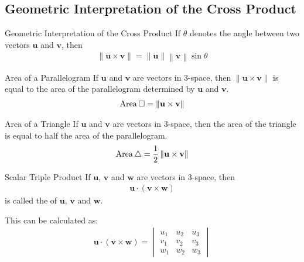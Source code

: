 \documentclass[\main/notes.tex]{subfiles}
\begin{document}
			\subsection{Geometric Interpretation of the Cross Product}
				\begin{theorem}{Geometric Interpretation of the Cross Product}
					If $\theta$ denotes the angle between two vectors $\mathbf{u}$ and $\mathbf{v}$, then
					\begin{align*}
						\left\lVert \mathbf{u} \times \mathbf{v}\right\rVert = \left\lVert \mathbf{u}\right\rVert \left\lVert \mathbf{v}\right\rVert \sin \theta
					\end{align*}
				\end{theorem}
				\begin{definition}{Area of a Parallelogram}
					If $\mathbf{u}$ and $\mathbf{v}$ are vectors in $3$-space, then $\left\lVert \mathbf{u} \times \mathbf{v}\right\rVert$ is equal to the area of the parallelogram determined by $\mathbf{u}$ and $\mathbf{v}$.
					\begin{align*}
						\operatorname{Area} \square = \left\lVert \mathbf{u} \times \mathbf{v}\right\rVert
					\end{align*}
				\end{definition}
				\begin{definition}{Area of a Triangle}
					If $\mathbf{u}$ and $\mathbf{v}$ are vectors in $3$-space, then the area of the triangle is equal to half the area of the parallelogram.
					\begin{align*}
						\operatorname{Area} \triangle = \frac{1}{2} \left\lVert \mathbf{u} \times \mathbf{v}\right\rVert
					\end{align*}
				\end{definition}
				\begin{definition}{Scalar Triple Product}
					If $\mathbf{u}$, $\mathbf{v}$ and $\mathbf{w}$ are vectors in $3$-space, then
					\begin{align*}
						\mathbf{u} \cdot (\mathbf{v} \times \mathbf{w})
					\end{align*}
					is called the  of $\mathbf{u}$, $\mathbf{v}$ and $\mathbf{w}$.

					This can be calculated as:
					\begin{align*}
						\mathbf{u} \cdot (\mathbf{v} \times \mathbf{w}) = \begin{vmatrix}
							u_{1} & u_{2} & u_{3}\\
							v_{1} & v_{2} & v_{3}\\
							w_{1} & w_{2} & w_{3}
						\end{vmatrix}
					\end{align*}
				\end{definition}
\end{document}
